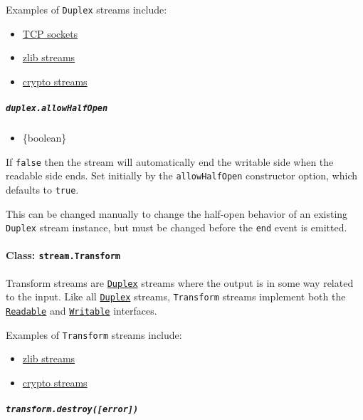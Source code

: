 Examples of \texttt{Duplex} streams include:

\begin{itemize}
\tightlist
\item
  \href{net.md\#class-netsocket}{TCP sockets}
\item
  \href{zlib.md}{zlib streams}
\item
  \href{crypto.md}{crypto streams}
\end{itemize}

\subparagraph{\texorpdfstring{\texttt{duplex.allowHalfOpen}}{duplex.allowHalfOpen}}\label{duplex.allowhalfopen}

\begin{itemize}
\tightlist
\item
  \{boolean\}
\end{itemize}

If \texttt{false} then the stream will automatically end the writable
side when the readable side ends. Set initially by the
\texttt{allowHalfOpen} constructor option, which defaults to
\texttt{true}.

This can be changed manually to change the half-open behavior of an
existing \texttt{Duplex} stream instance, but must be changed before the
\texttt{\textquotesingle{}end\textquotesingle{}} event is emitted.

\paragraph{\texorpdfstring{Class:
\texttt{stream.Transform}}{Class: stream.Transform}}\label{class-stream.transform}

Transform streams are \hyperref[class-streamduplex]{\texttt{Duplex}}
streams where the output is in some way related to the input. Like all
\hyperref[class-streamduplex]{\texttt{Duplex}} streams,
\texttt{Transform} streams implement both the
\hyperref[class-streamreadable]{\texttt{Readable}} and
\hyperref[class-streamwritable]{\texttt{Writable}} interfaces.

Examples of \texttt{Transform} streams include:

\begin{itemize}
\tightlist
\item
  \href{zlib.md}{zlib streams}
\item
  \href{crypto.md}{crypto streams}
\end{itemize}

\subparagraph{\texorpdfstring{\texttt{transform.destroy({[}error{]})}}{transform.destroy({[}error{]})}}\label{transform.destroyerror}

